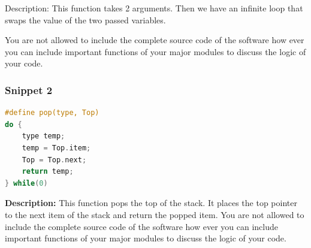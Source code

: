 Description: This function takes 2 arguments. Then we have an infinite loop that swaps the value of the two passed variables.

You are not allowed to include the complete source code of the software how ever you can include important functions of your major modules to discuss the logic of your code.

\subsubsection{Snippet 2}
\begin{lstlisting}[language=C]
#define pop(type, Top) 
do { 
    type temp; 
    temp = Top.item; 
    Top = Top.next; 
    return temp; 
} while(0)
\end{lstlisting}

\textbf{Description:} This function pops the top of the stack. It places the top pointer to the next item of the stack and return the popped item.
You are not allowed to include the complete source code of the software how ever you can include important functions of your major modules to discuss the logic of your code.


\setcounter{chapter}{4}           
